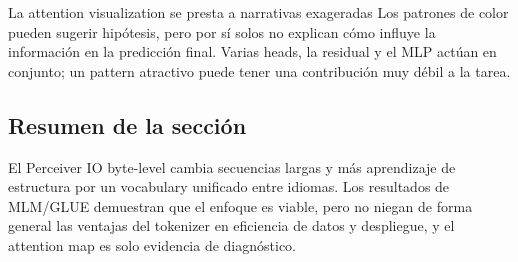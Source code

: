 
\begin{warningbox}{La attention visualization se presta a narrativas exageradas}
Los patrones de color pueden sugerir hipótesis, pero por sí solos no explican cómo influye la información en la predicción final. Varias heads, la residual y el MLP actúan en conjunto; un pattern atractivo puede tener una contribución muy débil a la tarea.
\end{warningbox}

\subsection{Resumen de la sección}

El Perceiver IO byte-level cambia secuencias largas y más aprendizaje de estructura por un vocabulary unificado entre idiomas. Los resultados de MLM/GLUE demuestran que el enfoque es viable, pero no niegan de forma general las ventajas del tokenizer en eficiencia de datos y despliegue, y el attention map es solo evidencia de diagnóstico.

